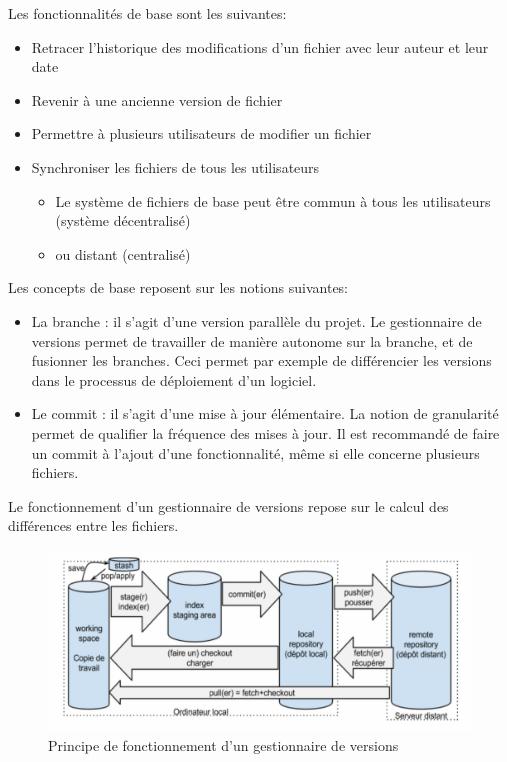 Les fonctionnalités de base sont les suivantes:
\begin{itemize}
\item Retracer l'historique des modifications d'un fichier avec leur auteur et leur date
\item Revenir à une ancienne version de fichier
\item Permettre à plusieurs utilisateurs de modifier un fichier
\item Synchroniser les fichiers de tous les utilisateurs
\begin{itemize}
\item Le système de fichiers de base peut être commun à tous les utilisateurs (système décentralisé)
\item ou distant (centralisé)
\end{itemize}
\end{itemize}

Les concepts de base reposent sur les notions suivantes:
\begin{itemize}
\item La branche : il s'agit d'une version parallèle du projet. Le gestionnaire de versions permet de travailler de manière autonome sur la branche, et de fusionner les branches. Ceci permet par exemple de différencier les versions dans le processus de déploiement d'un logiciel. 
\item Le commit : il s'agit d'une mise à jour élémentaire. La notion de granularité permet de qualifier la fréquence des mises à jour. Il est recommandé de faire un commit à l'ajout d'une fonctionnalité, même si elle concerne plusieurs fichiers. 
\end{itemize}

Le fonctionnement d'un gestionnaire de versions repose sur le calcul des différences entre les fichiers. 




\begin{figure}[!h]
\centering
\includegraphics[scale=0.6]{images/technique_git.png}
\caption{Principe de fonctionnement d'un gestionnaire de versions}
\label{fonction}
\end{figure}

